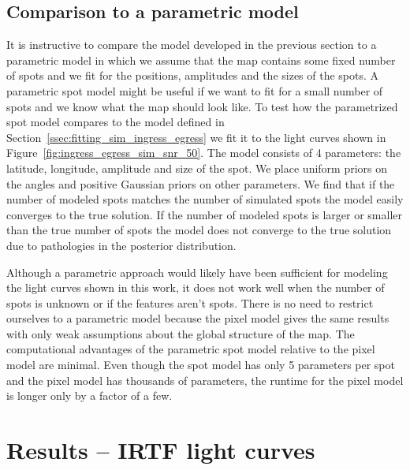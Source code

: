\documentclass[modern]{aastex62}
\begin{document}
\subsection{Comparison to a parametric model}
It is instructive to compare the model developed in the previous section to a parametric model in which we assume that the map contains some fixed number of spots and we fit for the positions, amplitudes and the sizes of the spots.
A parametric spot model might be useful if we want to fit for a small number of spots and we know what the map should look like.
To test how the parametrized spot model compares to the model defined in Section~\ref{ssec:fitting_sim_ingress_egress} we fit it to the light curves shown in Figure~\ref{fig:ingress_egress_sim_snr_50}. 
The model consists of 4 parameters: the latitude, longitude, amplitude and size of the spot.
We place uniform priors on the angles and positive Gaussian priors on other parameters. 
We find that if the number of modeled spots matches the number of simulated spots the model easily converges to the true solution. 
If the number of modeled spots is larger or smaller than the true number of spots the model does not converge to the true solution due to pathologies in the posterior distribution.

Although a parametric approach would likely have been sufficient for modeling the light curves shown in this work, it does not work well when the number of spots is unknown or if the features aren't spots.
There is no need to restrict ourselves to a parametric model because the pixel model gives the same results with only weak assumptions about the global structure of the map. 
The computational advantages of the parametric spot model relative to the pixel model are minimal. 
Even though the spot model has only 5 parameters per spot and the pixel model has thousands of parameters, the runtime for the pixel model is longer only by a factor of a few. 

\section{Results -- IRTF light curves}
\label{sec:results}
\end{document}
